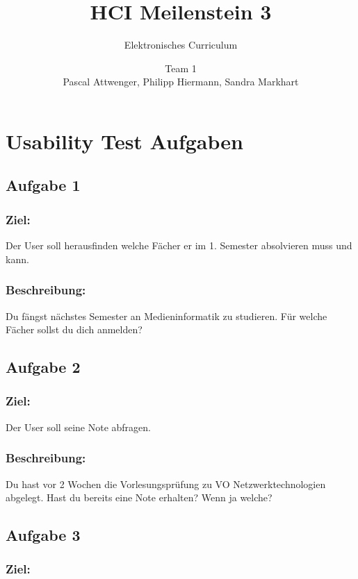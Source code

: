 \documentclass[a4paper,10pt]{scrartcl}
\title{HCI Meilenstein 3}
\subtitle{Elektronisches Curriculum}
\author{Team 1 \\Pascal Attwenger, Philipp Hiermann, Sandra Markhart}
\begin{document}
\maketitle

\section{Usability Test Aufgaben}

\subsection{Aufgabe 1}

\subsubsection*{Ziel:}
 
Der User soll herausfinden welche Fächer er im 1. Semester absolvieren muss und kann.
 
\subsubsection*{Beschreibung:}

Du fängst nächstes Semester an Medieninformatik zu studieren. Für welche Fächer sollst du dich anmelden?
 
\subsection{Aufgabe 2}

\subsubsection*{Ziel:}

Der User soll seine Note abfragen.

\subsubsection*{Beschreibung:}

Du hast vor 2 Wochen die Vorlesungsprüfung zu VO Netzwerktechnologien abgelegt. Hast du bereits eine Note erhalten? Wenn ja welche?

\subsection{Aufgabe 3}

\subsubsection*{Ziel:}
\end{document}
